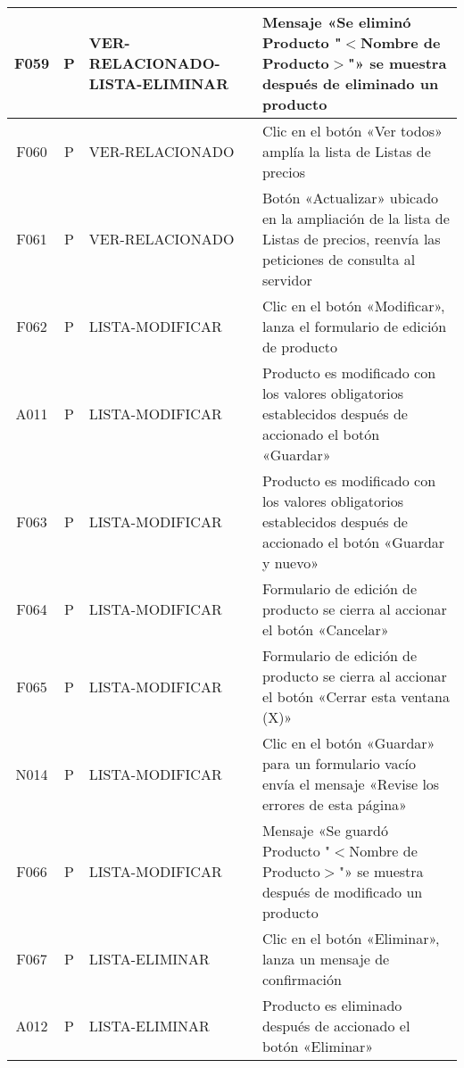 \begin{landscape}
{\begin{longtable}[htb]{|c|c|p{3.8cm}|p{15.2cm}|}
\scriptsize{F059} & \scriptsize{P} & \scriptsize{VER-RELACIONADO-LISTA-ELIMINAR} & \scriptsize{Mensaje «Se eliminó Producto "$<$Nombre de Producto$>$"» se muestra después de eliminado un producto} \\ \hline
\scriptsize{F060} & \scriptsize{P} & \scriptsize{VER-RELACIONADO} & \scriptsize{Clic en el botón «Ver todos» amplía la lista de Listas de precios} \\ \hline
\scriptsize{F061} & \scriptsize{P} & \scriptsize{VER-RELACIONADO} & \scriptsize{Botón «Actualizar» ubicado en la ampliación de la lista de Listas de precios, reenvía las peticiones de consulta al servidor} \\ \hline
\scriptsize{F062} & \scriptsize{P} & \scriptsize{LISTA-MODIFICAR} & \scriptsize{Clic en el botón «Modificar», lanza el formulario de edición de producto} \\ \hline
\scriptsize{A011} & \scriptsize{P} & \scriptsize{LISTA-MODIFICAR} & \scriptsize{Producto es modificado con los valores obligatorios establecidos después de accionado el botón «Guardar»} \\ \hline
\scriptsize{F063} & \scriptsize{P} & \scriptsize{LISTA-MODIFICAR} & \scriptsize{Producto es modificado con los valores obligatorios establecidos después de accionado el botón «Guardar y nuevo»} \\ \hline
\scriptsize{F064} & \scriptsize{P} & \scriptsize{LISTA-MODIFICAR} & \scriptsize{Formulario de edición de producto se cierra al accionar el botón «Cancelar»} \\ \hline
\scriptsize{F065} & \scriptsize{P} & \scriptsize{LISTA-MODIFICAR} & \scriptsize{Formulario de edición de producto se cierra al accionar el botón «Cerrar esta ventana (X)»} \\ \hline
\scriptsize{N014} & \scriptsize{P} & \scriptsize{LISTA-MODIFICAR} & \scriptsize{Clic en el botón «Guardar» para un formulario vacío envía el mensaje «Revise los errores de esta página»} \\ \hline
\scriptsize{F066} & \scriptsize{P} & \scriptsize{LISTA-MODIFICAR} & \scriptsize{Mensaje «Se guardó Producto "$<$Nombre de Producto$>$"» se muestra después de modificado un producto} \\ \hline
\scriptsize{F067} & \scriptsize{P} & \scriptsize{LISTA-ELIMINAR} & \scriptsize{Clic en el botón «Eliminar», lanza un mensaje de confirmación} \\ \hline
\scriptsize{A012} & \scriptsize{P} & \scriptsize{LISTA-ELIMINAR} & \scriptsize{Producto es eliminado después de accionado el botón «Eliminar»} \\ \hline

\end{longtable}}
\end{landscape}
